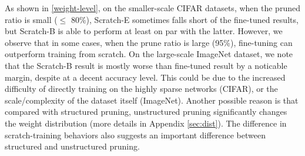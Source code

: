 As shown in \autoref{weight-level}, on the smaller-scale CIFAR datasets, when the pruned ratio is small ($\le$ 80\%), 
Scratch-E sometimes falls short of the fine-tuned results, but Scratch-B is able to perform at least on par with the latter. However, we observe that in some cases, when the prune ratio is large (95\%), fine-tuning can outperform training from scratch. 
On the large-scale ImageNet dataset, we note that the Scratch-B result is mostly worse than fine-tuned result by a noticable margin, despite at a decent accuracy level. 
 This could be due to the increased difficulty of directly training on the highly sparse networks (CIFAR), or the scale/complexity of the dataset itself (ImageNet). Another possible reason is that compared with structured pruning, unstructured pruning significantly changes the weight distribution (more details in Appendix \ref{sec:dist}). The difference in scratch-training behaviors also suggests an important difference between structured and unstructured pruning.